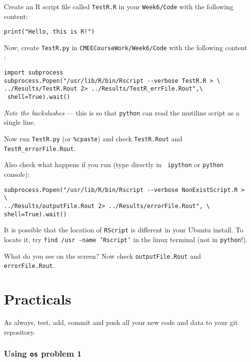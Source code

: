 \begin{compactitem}[$\quad\star$]

\item Create an R script file called {\tt TestR.R} in your {\tt Week6/Code} with the following content:
\begin{lstlisting}
print("Hello, this is R!")
\end{lstlisting}

\item Now, create {\tt TestR.py} in {\tt CMEECourseWork/Week6/Code} with the 
following content :
\begin{lstlisting}
import subprocess
subprocess.Popen("/usr/lib/R/bin/Rscript --verbose TestR.R > \
../Results/TestR.Rout 2> ../Results/TestR_errFile.Rout",\
 shell=True).wait()
\end{lstlisting}
\vspace{-12pt}
{\it Note the backslashes} --- this is so that {\tt python} can read 
the mutiline script as a single line.

\item Now run {\tt TestR.py} (or {\tt \%cpaste}) and check {\tt TestR.Rout} 
and {\tt TestR\_errorFile.Rout}. 

\item Also check what happens if you run (type directly in {\tt 
ipython} or {\tt python} console):
\begin{lstlisting}
subprocess.Popen("/usr/lib/R/bin/Rscript --verbose NonExistScript.R > \
../Results/outputFile.Rout 2> ../Results/errorFile.Rout", \
shell=True).wait()
\end{lstlisting}

\end{compactitem}

\begin{tipbox}
It is possible that the location of {\tt RScript} is different in your 
Ubuntu install. To locate it, try {\tt find /usr -name 'Rscript'} in the linux
terminal (not in {\tt python}!).
\end{tipbox}

What do you see on the screen? Now check {\tt outputFile.Rout} and 
{\tt errorFile.Rout}.

\section{Practicals}
As always, test, add, commit and push all your new code and data to 
your git repository. 
	
\subsubsection{Using {\tt os} problem 1} 
	
